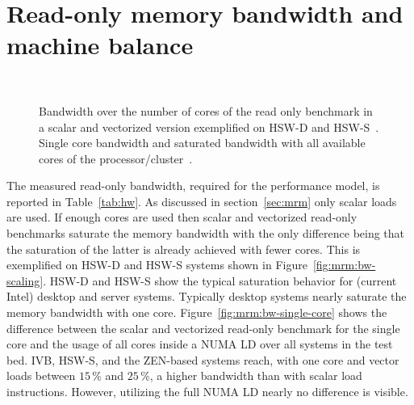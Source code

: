 \section{Read-only memory bandwidth and machine balance}
\label{sec:tb:membw}

\begin{figure}[!t]%
  \centering%
  \captionsetup[subfigure]{farskip=0pt}%
   \, \hspace{0.5cm}
  \caption{Bandwidth over the number of cores of the read only benchmark in a
scalar and vectorized version exemplified on HSW-D and
HSW-S~\protect{}.
Single core bandwidth and saturated bandwidth with all available cores of the
processor/cluster~\protect{}.}
  \label{fig:mrm:bw}
\end{figure}

The measured read-only bandwidth, required for the performance model, is
reported in Table~\ref{tab:hw}.
As discussed in section~\ref{sec:mrm} only scalar loads are used.
%
If enough cores are used then scalar and vectorized read-only benchmarks
saturate the memory bandwidth with the only difference being that the saturation of
the latter is already achieved with fewer cores. 
This is exemplified on HSW-D and HSW-S systems shown in
Figure~\ref{fig:mrm:bw-scaling}.
HSW-D and HSW-S show the typical saturation behavior for (current Intel) desktop
and server systems. 
Typically desktop systems nearly saturate the memory bandwidth with one core.
%
Figure~\ref{fig:mrm:bw-single-core} shows the difference between the scalar and
vectorized read-only benchmark for the single core and the usage of all cores
inside a NUMA LD over all systems in the test bed.
IVB, HSW-S, and the ZEN-based
systems reach,
with one core and vector loads between $15$\,\% and
$25$\,\%,
a higher bandwidth
than with scalar load instructions.
However, utilizing the full NUMA LD nearly no difference is visible.
%


